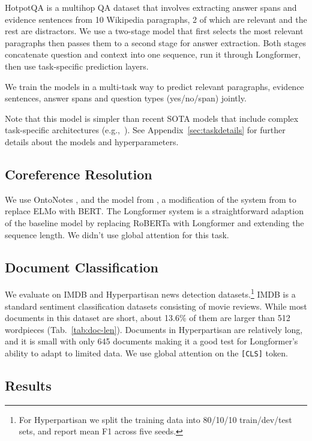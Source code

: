 HotpotQA is a multihop QA dataset that involves extracting answer spans and evidence sentences from 10 Wikipedia paragraphs, 2 of which are relevant and the rest are distractors. We use a two-stage model that first selects the most relevant paragraphs then passes them to a second stage for answer extraction. Both stages concatenate question and context into one sequence, run it through Longformer, then use task-specific prediction layers. 

We train the models in a multi-task way to predict relevant paragraphs, evidence sentences, answer spans and question types (yes/no/span) jointly.

Note that this model is simpler than recent SOTA models that include complex task-specific architectures (e.g.,~\cite{Tu2019SelectAA,Chen2019MultihopQA,Tu2020GraphSN,quark2020}). See Appendix~\ref{sec:taskdetails} for further details about the models and hyperparameters.

\subsection{Coreference Resolution} We use OntoNotes \cite{pradhan-etal-2012-conll}, and the model from \citet{joshi-etal-2019-bert}, a modification of the system from \citet{lee-etal-2018-higher} to replace ELMo with BERT. The Longformer system is a straightforward adaption of the baseline model by replacing RoBERTa with Longformer and extending the sequence length. We didn't use global attention for this task. 

\subsection{Document Classification } We evaluate on IMDB \cite{imdb} and Hyperpartisan news detection \cite{hyperpartisan} datasets.\footnote{
For Hyperpartisan we split the training data into 80/10/10 train/dev/test sets, and report mean F1 across five seeds.} IMDB is a standard sentiment classification datasets consisting of movie reviews. While most documents in this dataset are short, about 13.6\% of them are larger than 512 wordpieces (Tab.~\ref{tab:doc-len}).
Documents in Hyperpartisan are relatively long, and it is small with only 645 documents making it a good test for Longformer's ability to adapt to limited data. We use global attention on the \texttt{[CLS]} token. 

\subsection{Results}

